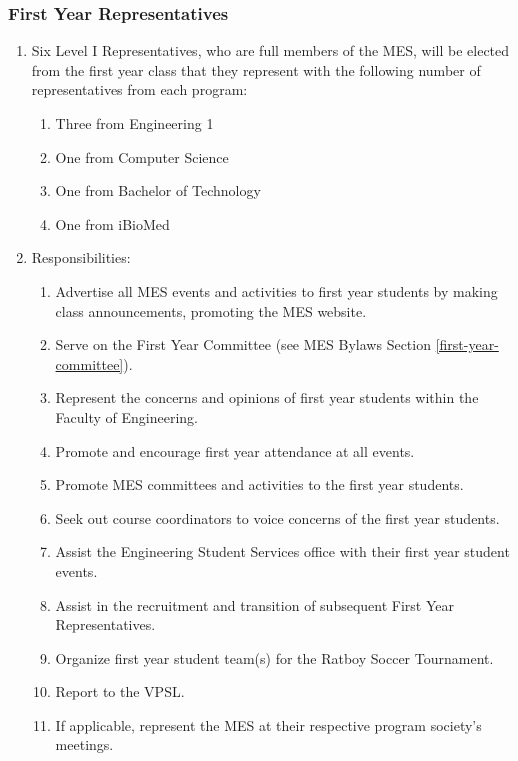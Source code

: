 \subsubsection{First Year
 Representatives}
\label{first-year-representatives}
\begin{enumerate}
 \item
  Six Level I Representatives, who are full members of the MES, will be elected from the first year class that they represent with the following number of representatives from each program:

  \begin{enumerate}
   \item
    Three from Engineering 1
   \item
    One from Computer Science
   \item
    One from Bachelor of Technology
   \item
    One from iBioMed
  \end{enumerate}
 \item
  Responsibilities:

  \begin{enumerate}
   \item
    Advertise all MES events and activities to first year students by making class announcements, promoting the MES website.
   \item
    Serve on the First Year Committee (see MES Bylaws Section \ref{first-year-committee}).
   \item
    Represent the concerns and opinions of first year students within the Faculty of Engineering.
   \item
    Promote and encourage first year attendance at all events.
   \item
    Promote MES committees and activities to the first year students.
   \item
    Seek out course coordinators to voice concerns of the first year students.
   \item
    Assist the Engineering Student Services office with their first year student events.
   \item
    Assist in the recruitment and transition of subsequent First Year Representatives.
   \item
    Organize first year student team(s) for the Ratboy Soccer Tournament.
   \item
    Report to the VPSL.
   \item
    If applicable, represent the MES at their respective program society's meetings.
  \end{enumerate}
\end{enumerate}

